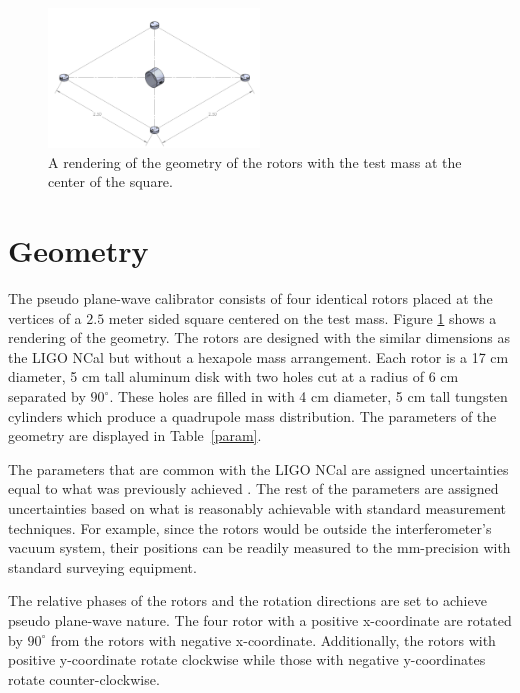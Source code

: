 \documentclass[superscriptaddress, twocolumn, prd]{revtex4-1}
\begin{document}
\begin{figure}[!h]
\centering \includegraphics[width=0.5\textwidth]{Super4_Model.pdf}
\caption{A rendering of the geometry of the rotors with the test mass at the center of the square.}
\label{cad} 
\end{figure}

\section{Geometry}

The pseudo plane-wave calibrator consists of four identical rotors placed at the vertices of a $2.5$ meter sided square centered on the test mass. Figure \ref{cad} shows a rendering of the geometry. The rotors are designed with the similar dimensions as the LIGO NCal \cite{ncal} but without a hexapole mass arrangement. Each rotor is a 17 cm diameter, 5 cm tall aluminum disk with two holes cut at a radius of 6 cm separated by $90^\circ$. These holes are filled in with 4 cm diameter, 5 cm tall  tungsten cylinders which produce a quadrupole mass distribution. The parameters of the geometry are displayed in Table~\ref{param}.

The parameters that are common with the LIGO NCal are assigned uncertainties equal to what was previously achieved \cite{ncal}. The rest of the parameters are assigned uncertainties based on what is reasonably achievable with standard measurement techniques. For example, since the rotors would be outside the interferometer's vacuum system, their positions can be readily measured to the mm-precision with standard surveying equipment.

The relative phases of the rotors and the rotation directions are set to achieve pseudo plane-wave nature. The four rotor with a positive x-coordinate are rotated by $90^\circ$ from the rotors with negative x-coordinate. Additionally, the rotors with positive y-coordinate rotate clockwise while those with negative y-coordinates rotate counter-clockwise. 
\end{document}
